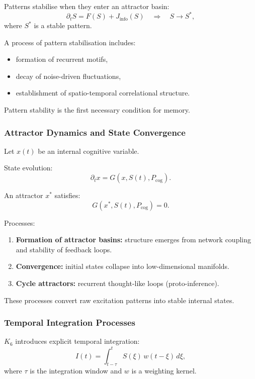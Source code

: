 Patterns stabilise when they enter an attractor basin:
\[
\partial_t S = F(S) + J_{\text{info}}(S)
\quad\Rightarrow\quad
S \to S^\ast,
\]
where $S^\ast$ is a stable pattern.

A process of pattern stabilisation includes:
\begin{itemize}
    \item formation of recurrent motifs,
    \item decay of noise-driven fluctuations,
    \item establishment of spatio-temporal correlational structure.
\end{itemize}

Pattern stability is the first necessary condition for memory.

\subsubsection{Attractor Dynamics and State Convergence}

Let $x(t)$ be an internal cognitive variable.

State evolution:
\[
\partial_t x = G(x, S(t), P_{\text{cog}}).
\]

An attractor $x^\ast$ satisfies:
\[
G(x^\ast, S(t), P_{\text{cog}})=0.
\]

Processes:
\begin{enumerate}
    \item \textbf{Formation of attractor basins:}
    structure emerges from network coupling and stability of feedback loops.
    \item \textbf{Convergence:}
    initial states collapse into low-dimensional manifolds.
    \item \textbf{Cycle attractors:}
    recurrent thought-like loops (proto-inference).
\end{enumerate}

These processes convert raw excitation patterns into stable internal states.

\subsubsection{Temporal Integration Processes}

$K_6$ introduces explicit temporal integration:
\[
I(t) = \int_{t-\tau}^{t} S(\xi)\, w(t-\xi)\,d\xi,
\]
where $\tau$ is the integration window and $w$ is a weighting kernel.

